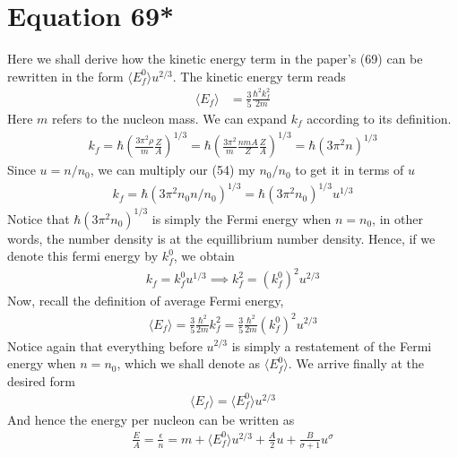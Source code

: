 \documentclass{article}
\newcommand{\la}{\langle}
\newcommand{\ra}{\rangle}
\begin{document}
\section*{Equation 69*}
Here we shall derive how the kinetic
 energy term in the paper's (69) can be rewritten in the form $\la E_f^0\ra u^{2/3}$. 
 The kinetic energy term  reads 
 \begin{align}
    \la E_f\ra&=\frac{3}{5}\frac{\hbar^2 k_f^2}{2m}
 \end{align}
 Here $m$ refers to the nucleon mass. We can expand $k_f$ according to its definition. 
 \begin{align}
    k_f=\hbar(\frac{3\pi^2\rho}{m}\frac{Z}{A})^{1/3}=\hbar(\frac{3\pi^2}{m}\frac{nmA}{Z}\frac{Z}{A})^{1/3}=\hbar(3\pi^2n)^{1/3}
 \end{align}
 Since $u=n/n_0$, we can multiply our (54) my $n_0/n_0$ to get it in terms of $u$ 
 \begin{align}
    k_f=\hbar(3\pi^2n_0 n/n_0)^{1/3}=\hbar(3\pi^2n_0)^{1/3}u^{1/3}
 \end{align}
 Notice that $\hbar(3\pi^2n_0)^{1/3}$ is simply the Fermi energy when $n=n_0$, in other words, the 
 number density is at the equillibrium number density. Hence, if we denote this fermi energy by $k_f^0$, we obtain 
 \begin{align}
    k_f=k_f^0u^{1/3}\implies k_f^2=(k_f^0)^2u^{2/3}
 \end{align}
 Now, recall the definition of average Fermi energy, 
 \begin{align}
    \la E_f\ra=\frac{3}{5}\frac{\hbar^2}{2m}k_f^2=\frac{3}{5}\frac{\hbar^2}{2m}(k_f^0)^2u^{2/3}
 \end{align}
 Notice again that everything before $u^{2/3}$ is simply a restatement of the Fermi energy when $n=n_0$, 
 which we shall denote as $\la E_f^0\ra$. We arrive finally at the desired form 
 \begin{align}
    \boxed{\la E_f\ra=\la E_f^0\ra u^{2/3}}
 \end{align}
 And hence the energy per nucleon can be written as 
 \begin{align}
    \frac{E}{A}=\frac{\epsilon}{n}=m+\la E_f^0\ra u^{2/3}+\frac{A}{2}u+\frac{B}{\sigma+1}u^{\sigma}
 \end{align}
\end{document}
